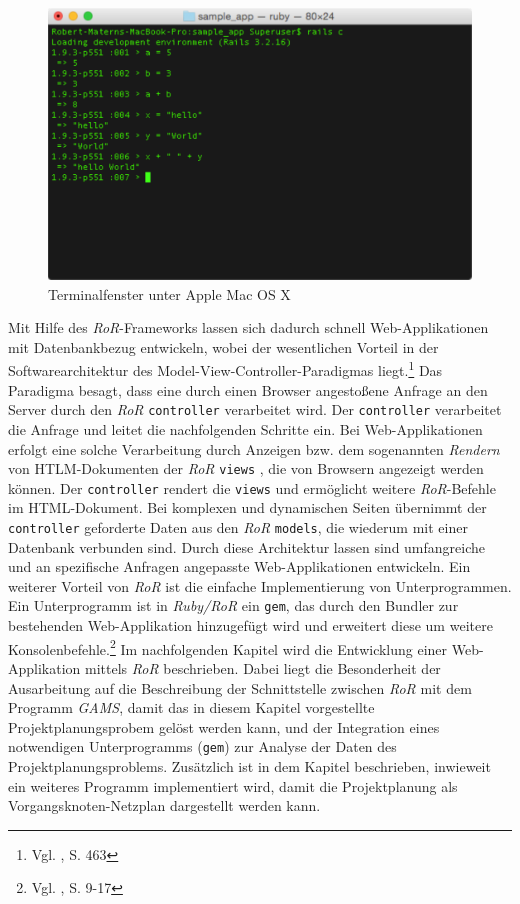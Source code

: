 \documentclass[a4paper,12pt,parskip,bibtotoc,liststotoc]{article}
\begin{document}
\begin{figure}[h!]
  \begin{center}
    \includegraphics[width=150mm]{Bilder/Terminal.pdf}
    \caption{Terminalfenster unter Apple Mac OS X}  \label{Terminal}
  \end{center}
\end{figure}

Mit Hilfe des \textit{RoR}-Frameworks lassen sich dadurch schnell Web-Applikationen mit Datenbankbezug entwickeln, wobei der wesentlichen Vorteil in der Softwarearchitektur des Model-View-Controller-Paradigmas liegt.\footnote{Vgl. \cite{walter2008ruby}, S. 463} Das Paradigma besagt, dass eine durch einen Browser angestoßene Anfrage an den Server durch den \textit{RoR} \texttt{controller} verarbeitet wird. Der \texttt{controller} verarbeitet die Anfrage und leitet die nachfolgenden Schritte ein. Bei Web-Applikationen erfolgt eine solche Verarbeitung durch Anzeigen bzw. dem sogenannten \textit{Rendern} von HTLM-Dokumenten der \textit{RoR} \texttt{views} , die von Browsern angezeigt werden können. Der \texttt{controller} rendert die \texttt{views} und ermöglicht weitere \textit{RoR}-Befehle im HTML-Dokument. Bei komplexen und dynamischen Seiten übernimmt der \texttt{controller} geforderte Daten aus den \textit{RoR} \texttt{models}, die wiederum mit einer Datenbank verbunden sind. Durch diese Architektur lassen sind umfangreiche und an spezifische Anfragen angepasste Web-Applikationen entwickeln. Ein weiterer Vorteil von \textit{RoR} ist die einfache Implementierung von Unterprogrammen. Ein Unterprogramm ist in \textit{Ruby/RoR} ein \texttt{gem}, das durch den Bundler zur bestehenden Web-Applikation hinzugefügt wird und erweitert diese um weitere Konsolenbefehle.\footnote{Vgl. \cite{hartl2012ruby}, S. 9-17} Im nachfolgenden Kapitel wird die Entwicklung einer Web-Applikation mittels \textit{RoR} beschrieben. Dabei liegt die Besonderheit der Ausarbeitung auf die Beschreibung der Schnittstelle zwischen \textit{RoR} mit dem Programm \textit{GAMS}, damit das in diesem Kapitel vorgestellte Projektplanungsprobem gelöst werden kann, und der Integration eines notwendigen Unterprogramms (\texttt{gem}) zur Analyse der Daten des Projektplanungsproblems. Zusätzlich ist in dem Kapitel beschrieben, inwieweit ein weiteres Programm implementiert wird, damit die Projektplanung als Vorgangsknoten-Netzplan dargestellt werden kann.
\end{document}
